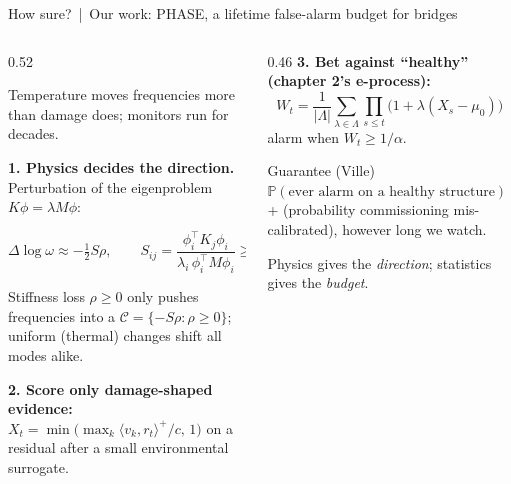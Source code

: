 \documentclass[aspectratio=169,10pt]{beamer}
\begin{document}
\begin{frame}{How sure? \,|\, Our work: PHASE, a lifetime false-alarm budget for bridges}
\begin{columns}[T]
\begin{column}{0.52\textwidth}
{\footnotesize Temperature moves frequencies more than damage does; monitors run for decades.

\textbf{1. Physics decides the direction.} Perturbation of the eigenproblem \(K\phi=\lambda M\phi\):}
\[\Delta\log\omega\approx-\tfrac12 S\rho,\qquad S_{ij}=\frac{\phi_i^\top K_j\phi_i}{\lambda_i\,\phi_i^\top M\phi_i}\ge0\]
{\footnotesize Stiffness loss \(\rho\ge0\) only pushes frequencies into a  \(\mathcal C=\{-S\rho:\rho\ge0\}\); uniform (thermal) changes shift all modes alike.

\textbf{2. Score only damage-shaped evidence:} \(X_t=\min\big(\max_k\langle v_k,r_t\rangle^+/c,\,1\big)\) on a residual after a small environmental surrogate.}
\end{column}
\begin{column}{0.46\textwidth}
{\footnotesize\textbf{3. Bet against ``healthy'' (chapter 2's e-process):}
\[W_t=\frac1{|\Lambda|}\sum_{\lambda\in\Lambda}\prod_{s\le t}\big(1+\lambda(X_s-\mu_0)\big)\]
alarm when \(W_t\ge1/\alpha\).}
\vspace{1mm}
\begin{alertblock}{Guarantee (Ville)}
{\footnotesize \(\mathbb P(\text{ever alarm on a healthy structure})\le\alpha\) + (probability commissioning mis-calibrated), however long we watch.}
\end{alertblock}
\vspace{1mm}
{\footnotesize Physics gives the \emph{direction}; statistics gives the \emph{budget}.}
\end{column}
\end{columns}
\end{frame}
\end{document}
